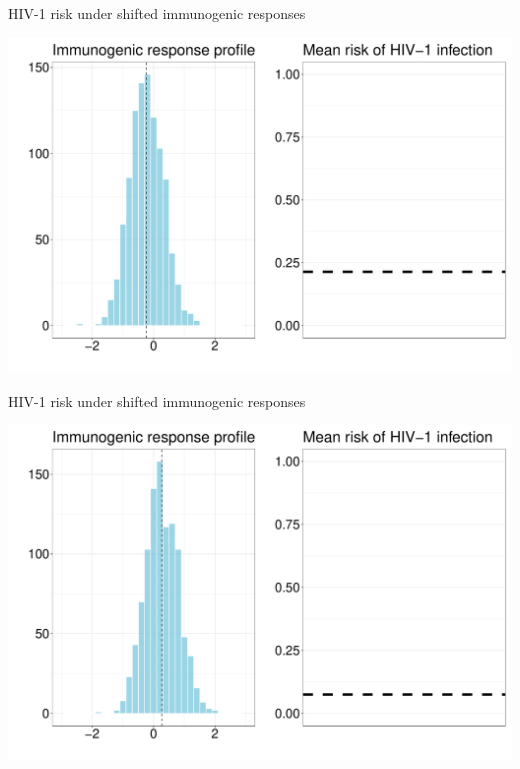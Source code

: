 \documentclass{beamer}
\begin{document}

\begin{frame}[c,noframenumbering]{HIV-1 risk under shifted immunogenic responses}

\hspace*{-1cm}\includegraphics[scale=0.4]{shift-5}

\note{
}

\end{frame}


\begin{frame}[c,noframenumbering]{HIV-1 risk under shifted immunogenic responses}

\hspace*{-1cm}\includegraphics[scale=0.4]{shift-6}

\note{
}

\end{frame}
\end{document}

